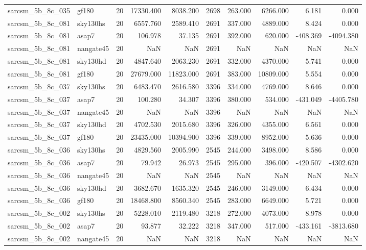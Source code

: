 \documentclass{article}
\begin{document}
\begin{longtable}{llrrrrrrrr}
sarcsm\_5b\_8c\_035 & gf180 & 20 & 17330.400 & 8038.200 & 2698 & 263.000 & 6266.000 & 6.181 & 0.000 \\
sarcsm\_5b\_8c\_081 & sky130hs & 20 & 6557.760 & 2589.410 & 2691 & 337.000 & 4889.000 & 8.424 & 0.000 \\
sarcsm\_5b\_8c\_081 & asap7 & 20 & 106.978 & 37.135 & 2691 & 392.000 & 620.000 & -408.369 & -4094.380 \\
sarcsm\_5b\_8c\_081 & nangate45 & 20 & NaN & NaN & 2691 & NaN & NaN & NaN & NaN \\
sarcsm\_5b\_8c\_081 & sky130hd & 20 & 4847.640 & 2063.230 & 2691 & 332.000 & 4370.000 & 5.741 & 0.000 \\
sarcsm\_5b\_8c\_081 & gf180 & 20 & 27679.000 & 11823.000 & 2691 & 383.000 & 10809.000 & 5.554 & 0.000 \\
sarcsm\_5b\_8c\_037 & sky130hs & 20 & 6483.470 & 2616.580 & 3396 & 334.000 & 4769.000 & 8.646 & 0.000 \\
sarcsm\_5b\_8c\_037 & asap7 & 20 & 100.280 & 34.307 & 3396 & 380.000 & 534.000 & -431.049 & -4405.780 \\
sarcsm\_5b\_8c\_037 & nangate45 & 20 & NaN & NaN & 3396 & NaN & NaN & NaN & NaN \\
sarcsm\_5b\_8c\_037 & sky130hd & 20 & 4702.530 & 2015.680 & 3396 & 326.000 & 4355.000 & 6.561 & 0.000 \\
sarcsm\_5b\_8c\_037 & gf180 & 20 & 23435.000 & 10394.900 & 3396 & 339.000 & 8952.000 & 5.636 & 0.000 \\
sarcsm\_5b\_8c\_036 & sky130hs & 20 & 4829.560 & 2005.990 & 2545 & 244.000 & 3498.000 & 8.586 & 0.000 \\
sarcsm\_5b\_8c\_036 & asap7 & 20 & 79.942 & 26.973 & 2545 & 295.000 & 396.000 & -420.507 & -4302.620 \\
sarcsm\_5b\_8c\_036 & nangate45 & 20 & NaN & NaN & 2545 & NaN & NaN & NaN & NaN \\
sarcsm\_5b\_8c\_036 & sky130hd & 20 & 3682.670 & 1635.320 & 2545 & 246.000 & 3149.000 & 6.434 & 0.000 \\
sarcsm\_5b\_8c\_036 & gf180 & 20 & 18468.800 & 8560.340 & 2545 & 283.000 & 6649.000 & 5.721 & 0.000 \\
sarcsm\_5b\_8c\_002 & sky130hs & 20 & 5228.010 & 2119.480 & 3218 & 272.000 & 4073.000 & 8.978 & 0.000 \\
sarcsm\_5b\_8c\_002 & asap7 & 20 & 93.877 & 32.222 & 3218 & 347.000 & 517.000 & -433.161 & -3813.680 \\
sarcsm\_5b\_8c\_002 & nangate45 & 20 & NaN & NaN & 3218 & NaN & NaN & NaN & NaN \\

\end{longtable}
\end{document}
